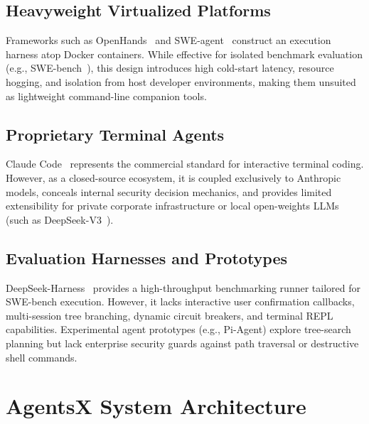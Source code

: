 \documentclass[10pt,twocolumn,letterpaper]{article}
\begin{document}
\subsection{Heavyweight Virtualized Platforms}
Frameworks such as OpenHands~\cite{openhands2024} and SWE-agent~\cite{yang2024sweagent} construct an execution harness atop Docker containers. While effective for isolated benchmark evaluation (e.g., SWE-bench~\cite{jimenez2024swebench}), this design introduces high cold-start latency, resource hogging, and isolation from host developer environments, making them unsuited as lightweight command-line companion tools.

\subsection{Proprietary Terminal Agents}
Claude Code~\cite{anthropic2024claudecode} represents the commercial standard for interactive terminal coding. However, as a closed-source ecosystem, it is coupled exclusively to Anthropic models, conceals internal security decision mechanics, and provides limited extensibility for private corporate infrastructure or local open-weights LLMs (such as DeepSeek-V3~\cite{deepseek2024v3}).

\subsection{Evaluation Harnesses and Prototypes}
DeepSeek-Harness~\cite{deepseek2024harness} provides a high-throughput benchmarking runner tailored for SWE-bench execution. However, it lacks interactive user confirmation callbacks, multi-session tree branching, dynamic circuit breakers, and terminal REPL capabilities. Experimental agent prototypes (e.g., Pi-Agent) explore tree-search planning but lack enterprise security guards against path traversal or destructive shell commands.

\section{AgentsX System Architecture}
\label{sec:architecture}
\end{document}
